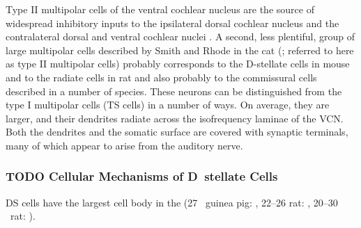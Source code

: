 Type II multipolar cells of the ventral cochlear
 nucleus are the source of widespread inhibitory inputs
 to the ipsilateral dorsal cochlear nucleus and the
 contralateral dorsal and ventral cochlear nuclei \citep{CantBenson:2003}.
 A second, less plentiful, group of large multipolar cells
 described by Smith and Rhode in the cat (\citealt{SmithRhode:1989}; referred
 to here as type II multipolar cells) probably corresponds
 to the D-stellate cells in mouse \citep{Oertel:1983} and to the radiate
 cells in rat \citep{DoucetRyugoEtAl:1999} and also probably to the commissural cells
 described in a number of species.%
 These neurons can be distinguished from the type I multipolar cells (TS cells) in a number of ways. On average, they are
 larger, and their dendrites radiate across the isofrequency
 laminae of the VCN. %
Both the dendrites
 and the somatic surface are covered with synaptic terminals, many of which appear to arise from the auditory nerve.%


\subsubsection{TODO Cellular Mechanisms of D~stellate Cells}

DS cells have the largest cell body in the \VCN  (27 \um~guinea pig: \citealt{ArnottWallaceEtAl:2004},
22--26 \um rat: \citealt{DoucetRyugo:1997}, 20--30 \um~rat: \citealt{PaoliniClark:1999}). 



